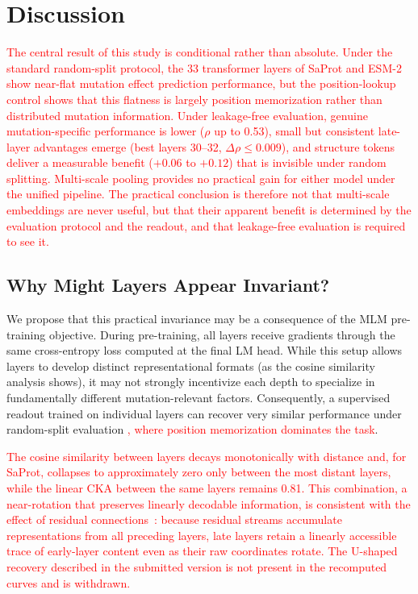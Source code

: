 \documentclass[11pt,a4paper]{article}
\newcommand{\revised}[1]{\textcolor{red}{#1}}
\begin{document}
\section{Discussion}

\revised{The central result of this study is conditional rather than absolute. Under
the standard random-split protocol, the 33 transformer layers of SaProt and ESM-2 show
near-flat mutation effect prediction performance, but the position-lookup control shows
that this flatness is largely position memorization rather than distributed mutation
information. Under leakage-free evaluation, genuine mutation-specific performance is
lower ($\rho$ up to 0.53), small but consistent late-layer advantages emerge (best
layers 30--32, $\Delta\rho \leq 0.009$), and structure tokens deliver a measurable
benefit ($+0.06$ to $+0.12$) that is invisible under random splitting. Multi-scale
pooling provides no practical gain for either model under the unified pipeline. The
practical conclusion is therefore not that multi-scale embeddings are never useful,
but that their apparent benefit is determined by the evaluation protocol and the
readout, and that leakage-free evaluation is required to see it.}

\subsection{Why Might Layers Appear Invariant?}

We propose that this practical invariance may be a consequence of the MLM pre-training
objective. During pre-training, all layers receive gradients through the same
cross-entropy loss computed at the final LM head. While this setup allows layers
to develop distinct representational formats (as the cosine similarity analysis
shows), it may not strongly incentivize each depth to specialize in fundamentally
different mutation-relevant factors. Consequently, a supervised readout trained on
individual layers can recover very similar performance under random-split evaluation
\revised{, where position memorization dominates the task}.

\revised{The cosine similarity between layers decays monotonically with distance and,
for SaProt, collapses to approximately zero only between the most distant layers,
while the linear CKA between the same layers remains 0.81. This combination, a
near-rotation that preserves linearly decodable information, is consistent with the
effect of residual connections~\cite{he2016deep}: because residual streams accumulate
representations from all preceding layers, late layers retain a linearly accessible
trace of early-layer content even as their raw coordinates rotate. The U-shaped
recovery described in the submitted version is not present in the recomputed curves
and is withdrawn.}
\end{document}
